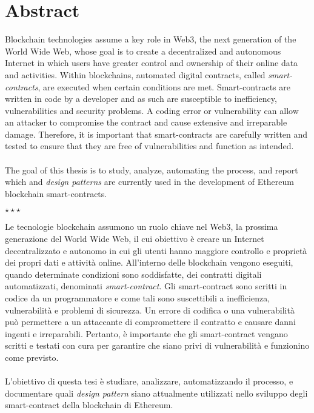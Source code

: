 \chapter*{Abstract}\label{abstract}
Blockchain technologies assume a key role in Web3, the next generation of the World Wide Web, whose goal is to create a decentralized and autonomous Internet in which users have greater control and ownership of their online data and activities. Within blockchains, automated digital contracts, called \textit{smart-contracts}, are executed when certain conditions are met. Smart-contracts are written in code by a developer and as such are susceptible to inefficiency, vulnerabilities and security problems. A coding error or vulnerability can allow an attacker to compromise the contract and cause extensive and irreparable damage. Therefore, it is important that smart-contracts are carefully written and tested to ensure that they are free of vulnerabilities and function as intended.\\
\\
The goal of this thesis is to study, analyze, automating the process, and report which and \textit{design patterns} are currently used in the development of Ethereum blockchain smart-contracts.
\vspace{40pt}
\begin{center}
\large$\star\star\star$
\end{center}
\vspace{40pt}
Le tecnologie blockchain assumono un ruolo chiave nel Web3, la prossima generazione del World Wide Web, il cui obiettivo è creare un Internet decentralizzato e autonomo in cui gli utenti hanno maggiore controllo e proprietà dei propri dati e attività online. All'interno delle blockchain vengono eseguiti, quando determinate condizioni sono soddisfatte, dei contratti digitali automatizzati, denominati \textit{smart-contract}. Gli smart-contract sono scritti in codice da un programmatore e come tali sono suscettibili a inefficienza, vulnerabilità e problemi di sicurezza. Un errore di codifica o una vulnerabilità può permettere a un attaccante di compromettere il contratto e causare danni ingenti e irreparabili. Pertanto, è importante che gli smart-contract vengano scritti e testati con cura per garantire che siano privi di vulnerabilità e funzionino come previsto.\\
\\
L'obiettivo di questa tesi è studiare, analizzare, automatizzando il processo, e documentare quali \textit{design pattern} siano attualmente utilizzati nello sviluppo degli smart-contract della blockchain di Ethereum.
 
